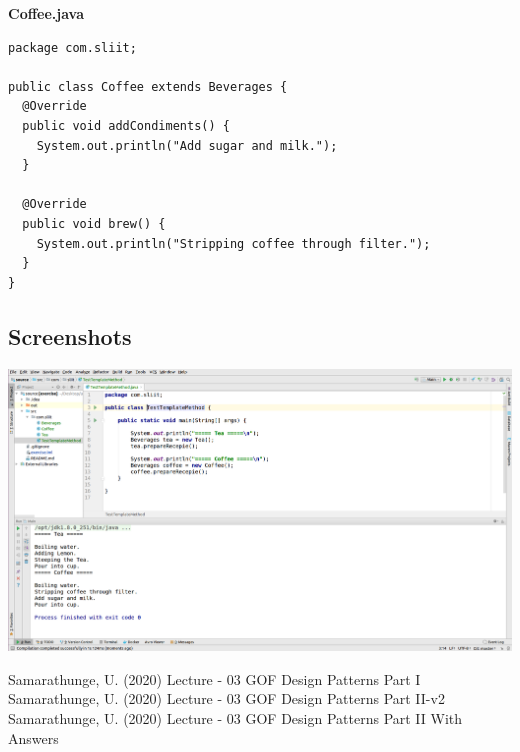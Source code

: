 \documentclass[12pt]{scrartcl} %
\begin{document}
\textbf{Coffee.java}
\lstset{language=Java}
\begin{lstlisting}[frame=single]
package com.sliit;

public class Coffee extends Beverages {
  @Override
  public void addCondiments() {
    System.out.println("Add sugar and milk.");
  }

  @Override
  public void brew() {
    System.out.println("Stripping coffee through filter.");
  }
}

\end{lstlisting}


\subsection*{Screenshots}

\begin{center}
	\includegraphics[width=1.0\columnwidth]{./figures/01.png}
	\label{Solution}%
\end{center}


\pagebreak
\newpage
\begin{thebibliography}{00}
	\raggedright
	 Samarathunge, U. (2020) Lecture - 03 GOF Design Patterns Part I
     Samarathunge, U. (2020) Lecture - 03 GOF Design Patterns Part II-v2
     Samarathunge, U. (2020) Lecture - 03 GOF Design Patterns Part II With Answers
\end{thebibliography}
\end{document}

